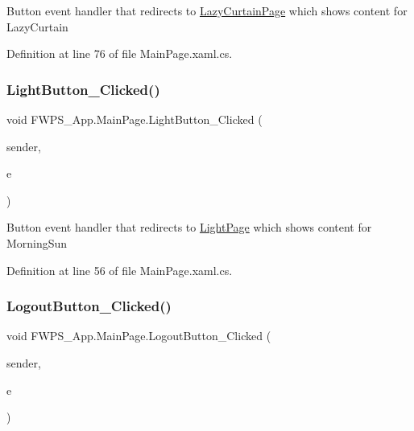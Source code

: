 Button event handler that redirects to \mbox{\hyperlink{class_f_w_p_s___app_1_1_lazy_curtain_page}{Lazy\+Curtain\+Page}} which shows content for Lazy\+Curtain 

Definition at line 76 of file Main\+Page.\+xaml.\+cs.

\mbox{\label{class_f_w_p_s___app_1_1_main_page_a13668c48ee1b286dd61b5ca4cce5e420}} 
\subsubsection{\texorpdfstring{Light\+Button\+\_\+\+Clicked()}{LightButton\_Clicked()}}
{\footnotesize\ttfamily void F\+W\+P\+S\+\_\+\+App.\+Main\+Page.\+Light\+Button\+\_\+\+Clicked (\begin{DoxyParamCaption}\item[{object}]{sender,  }\item[{Event\+Args}]{e }\end{DoxyParamCaption})\hspace{0.3cm}{\ttfamily [private]}}

Button event handler that redirects to \mbox{\hyperlink{class_f_w_p_s___app_1_1_light_page}{Light\+Page}} which shows content for Morning\+Sun 

Definition at line 56 of file Main\+Page.\+xaml.\+cs.

\mbox{\label{class_f_w_p_s___app_1_1_main_page_ac646ff6b51bf24320feeb9293181841b}} 
\subsubsection{\texorpdfstring{Logout\+Button\+\_\+\+Clicked()}{LogoutButton\_Clicked()}}
{\footnotesize\ttfamily void F\+W\+P\+S\+\_\+\+App.\+Main\+Page.\+Logout\+Button\+\_\+\+Clicked (\begin{DoxyParamCaption}\item[{object}]{sender,  }\item[{Event\+Args}]{e }\end{DoxyParamCaption})\hspace{0.3cm}{\ttfamily [private]}}

